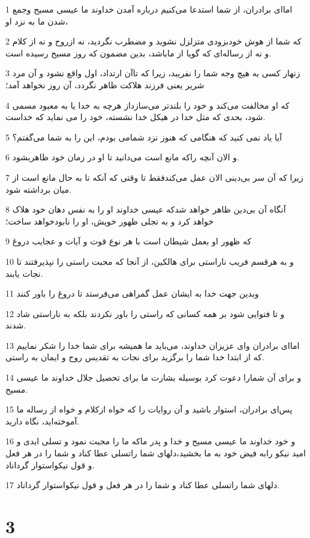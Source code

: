 \par 1 اما‌ای برادران، از شما استدعا می‌کنیم درباره آمدن خداوند ما عیسی مسیح وجمع شدن ما به نزد او،
\par 2 که شما از هوش خودبزودی متزلزل نشوید و مضطرب نگردید، نه ازروح و نه از کلام و نه از رساله‌ای که گویا از ماباشد، بدین مضمون که روز مسیح رسیده است.
\par 3 زنهار کسی به هیچ وجه شما را نفریبد، زیرا که تاآن ارتداد، اول واقع نشود و آن مرد شریر یعنی فرزند هلاکت ظاهر نگردد، آن روز نخواهد آمد؛
\par 4 که او مخالفت می‌کند و خود را بلندتر می‌سازداز هر‌چه به خدا یا به معبود مسمی شود، بحدی که مثل خدا در هیکل خدا نشسته، خود را می نماید که خداست.
\par 5 آیا یاد نمی کنید که هنگامی که هنوز نزد شمامی بودم، این را به شما می‌گفتم؟
\par 6 و الان آنچه راکه مانع است می‌دانید تا او در زمان خود ظاهربشود.
\par 7 زیرا که آن سر بی‌دینی الان عمل می‌کندفقط تا وقتی که آنکه تا به حال مانع است از میان برداشته شود.
\par 8 آنگاه آن بی‌دین ظاهر خواهد شدکه عیسی خداوند او را به نفس دهان خود هلاک خواهد کرد و به تجلی ظهور خویش، او را نابودخواهد ساخت؛
\par 9 که ظهور او بعمل شیطان است با هر نوع قوت و آیات و عجایب دروغ
\par 10 و به هرقسم فریب ناراستی برای هالکین، از آنجا که محبت راستی را نپذیرفتند تا نجات یابند.
\par 11 وبدین جهت خدا به ایشان عمل گمراهی می‌فرستد تا دروغ را باور کنند
\par 12 و تا فتوایی شود بر همه کسانی که راستی را باور نکردند بلکه به ناراستی شاد شدند.
\par 13 اما‌ای برادران و‌ای عزیزان خداوند، می‌باید ما همیشه برای شما خدا را شکر نماییم که از ابتدا خدا شما را برگزید برای نجات به تقدیس روح و ایمان به راستی.
\par 14 و برای آن شمارا دعوت کرد بوسیله بشارت ما برای تحصیل جلال خداوند ما عیسی مسیح.
\par 15 پس‌ای برادران، استوار باشید و آن روایات را که خواه ازکلام و خواه از رساله ما آموخته‌اید، نگاه دارید.
\par 16 و خود خداوند ما عیسی مسیح و خدا و پدر ماکه ما را محبت نمود و تسلی ابدی و امید نیکو رابه فیض خود به ما بخشید،دلهای شما راتسلی عطا کناد و شما را در هر فعل و قول نیکواستوار گرداناد.
\par 17 دلهای شما راتسلی عطا کناد و شما را در هر فعل و قول نیکواستوار گرداناد.

\chapter{3}

